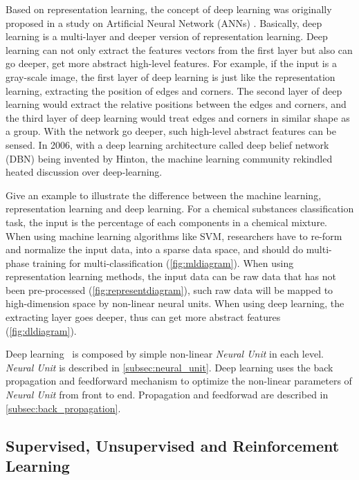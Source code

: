 \begin{spacing}{1.5}
Based on representation learning, the concept of deep learning was originally proposed in a study on Artificial Neural Network (ANNs) \cite{hinton2006reducing}. Basically, deep learning is a multi-layer and deeper version of representation learning. Deep learning can not only extract the features vectors from the first layer but also can go deeper, get more abstract high-level features. For example, if the input is a gray-scale image, the first layer of deep learning is just like the representation learning, extracting the position of edges and corners. The second layer of deep learning would extract the relative positions between the edges and corners, and the third layer of deep learning would treat edges and corners in similar shape as a group. With the network go deeper, such high-level abstract features can be sensed. In 2006, with a deep learning architecture called deep belief network (DBN) \cite{hinton2006fast} being invented by Hinton, the machine learning community rekindled heated discussion over deep-learning.

Give an example to illustrate the difference between the machine learning, representation learning and deep learning. For a chemical substances classification task, the input is the percentage of each components in a chemical mixture. When using machine learning algorithms like SVM, researchers have to re-form and normalize the input data, into a sparse data space, and should do multi-phase training for multi-classification (\autoref{fig:mldiagram}). When using representation learning methods, the input data can be raw data that has not been pre-processed (\autoref{fig:representdiagram}), such raw data will be mapped to high-dimension space by non-linear neural units. When using deep learning, the extracting layer goes deeper, thus can get more abstract features (\autoref{fig:dldiagram}).

Deep learning~\cite{lecun2015deep} is composed by simple non-linear \textit{Neural Unit} in each level. \textit{Neural Unit} is described in \autoref{subsec:neural_unit}. Deep learning uses the back propagation and feedforward mechanism to optimize the non-linear parameters of \textit{Neural Unit} from front to end. Propagation and feedforwad are described in \autoref{subsec:back_propagation}.


\subsection{Supervised, Unsupervised and Reinforcement Learning}


\end{spacing}
